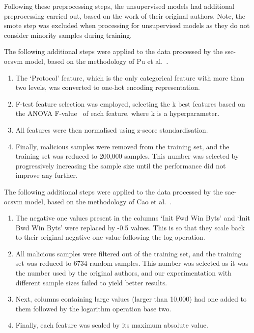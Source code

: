Following these preprocessing steps, the unsupervised models had additional
preprocessing carried out, based on the work of their original authors. Note,
the \gls{smote} step was excluded when processing for unsupervised models as
they do not consider minority samples during training.

The following additional steps were applied to the data processed by the
\gls{ssc}-\gls{ocsvm} model, based on the methodology of Pu et al.~\cite{Cao}.
\begin{enumerate}
      \item The `Protocol' feature, which is the only categorical feature with more than
            two levels, was converted to one-hot encoding representation.
      \item F-test feature selection was employed, selecting the k best features based on
            the ANOVA F-value~\cite{f_test} of each feature, where k is a hyperparameter.
      \item All features were then normalised using z-score standardisation.
      \item Finally, malicious samples were removed from the training set, and the training
            set was reduced to 200,000 samples. This number was selected by progressively
            increasing the sample size until the performance did not improve any further.
\end{enumerate}

The following additional steps were applied to the data processed by the
\gls{sae}-\gls{ocsvm} model, based on the methodology of Cao et al.~\cite{Cao}.
\begin{enumerate}
      \item The negative one values present in the columns `Init Fwd Win Byts' and `Init
            Bwd Win Byts' were replaced by -0.5 values. This is so that they scale back to
            their original negative one value following the log operation.
      \item All malicious samples were filtered out of the training set, and the training
            set was reduced to 6734 random samples. This number was selected as it was the
            number used by the original authors, and our experimentation with different
            sample sizes failed to yield better results.
      \item Next, columns containing large values (larger than 10,000) had one added to
            them followed by the logarithm operation base two.
      \item Finally, each feature was scaled by its maximum absolute value.
\end{enumerate}

